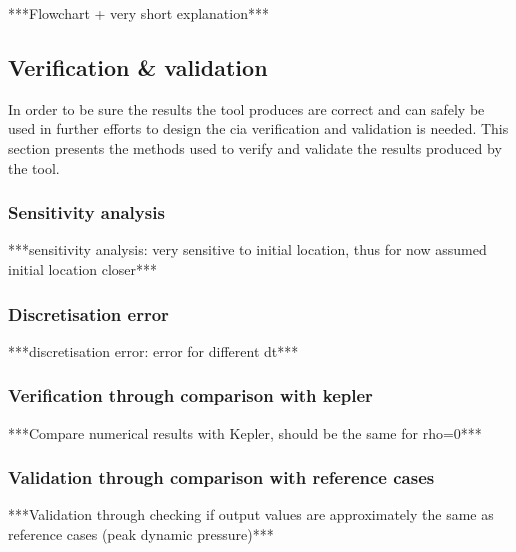 ***Flowchart + very short explanation***\\

\subsection{Verification \& validation}
\label{sec:astrovv}
In order to be sure the results the tool produces are correct and can safely be used in further efforts to design the \gls{cia} verification and validation is needed. This section presents the methods used to verify and validate the results produced by the tool.
\subsubsection{Sensitivity analysis}
\label{sec:astrosens}
***sensitivity analysis: very sensitive to initial location, thus for now assumed initial location closer***\\
\subsubsection{Discretisation error}
\label{sec:astrodisc}
***discretisation error: error for different dt***\\
\subsubsection{Verification through comparison with kepler}
\label{sec:astroverf}
***Compare numerical results with Kepler, should be the same for rho=0***\\
\subsubsection{Validation through comparison with reference cases}
\label{sec:astroval}
***Validation through checking if output values are approximately the same as reference cases (peak dynamic pressure)***\\

